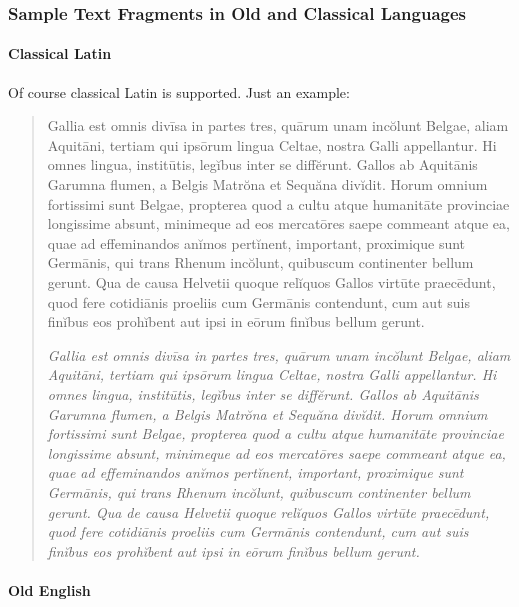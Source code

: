 \documentclass[12pt,a4paper,openany]{book}
\begin{document}
\subsubsection{Sample Text Fragments in Old and Classical Languages}

\paragraph{Classical Latin}

Of course classical Latin is supported. Just an example:

\begin{quote}
\large
{}
Gallia est omnis divīsa in partes tres, quārum unam incŏlunt Belgae, aliam
Aquitāni, tertiam qui ipsōrum lingua Celtae, nostra Galli appellantur. Hi
omnes lingua, institūtis, legĭbus inter se diffĕrunt. Gallos ab Aquitānis
Garumna flumen, a Belgis Matrŏna et Sequăna divĭdit. Horum omnium
fortissimi sunt Belgae, propterea quod a cultu atque humanitāte provinciae
longissime absunt, minimeque ad eos mercatōres saepe commeant atque ea, quae
ad effeminandos anĭmos pertĭnent, important, proximique sunt Germānis, qui
trans Rhenum incŏlunt, quibuscum continenter bellum gerunt. Qua de causa
Helvetii quoque relĭquos Gallos virtūte praecēdunt, quod fere cotidiānis
proeliis cum Germānis contendunt, cum aut suis finĭbus eos prohĭbent aut
ipsi in eōrum finĭbus bellum gerunt.

\smallskip

\itshape
Gallia est omnis divīsa in partes tres, quārum unam incŏlunt Belgae, aliam
Aquitāni, tertiam qui ipsōrum lingua Celtae, nostra Galli appellantur. Hi
omnes lingua, institūtis, legĭbus inter se diffĕrunt. Gallos ab Aquitānis
Garumna flumen, a Belgis Matrŏna et Sequăna divĭdit. Horum omnium
fortissimi sunt Belgae, propterea quod a cultu atque humanitāte provinciae
longissime absunt, minimeque ad eos mercatōres saepe commeant atque ea, quae
ad effeminandos anĭmos pertĭnent, important, proximique sunt Germānis, qui
trans Rhenum incŏlunt, quibuscum continenter bellum gerunt. Qua de causa
Helvetii quoque relĭquos Gallos virtūte praecēdunt, quod fere cotidiānis
proeliis cum Germānis contendunt, cum aut suis finĭbus eos prohĭbent aut
ipsi in eōrum finĭbus bellum gerunt.

\end{quote}

\paragraph{Old English}
\end{document}
